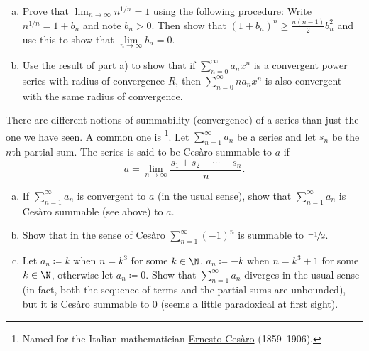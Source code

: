 \begin{samepage}
\begin{exercise}
\leavevmode
\begin{enumerate}[a)]
\item
Prove that $\lim_{n\to\infty} n^{1/n} = 1$ using the following procedure:  Write $n^{1/n} = 1+b_n$ and
note $b_n > 0$.  Then show that ${(1+b_n)}^n \geq 
\frac{n(n-1)}{2}b_n^2$ and use this to show that $\lim\limits_{n\to\infty} b_n = 0$.
\item
Use the result of part a) to show that
if $\sum_{n=0}^\infty a_n x^n$ is a convergent power series with radius of convergence $R$,
then $\sum_{n=0}^\infty n a_n x^n$ is also convergent with the same radius of convergence.
\end{enumerate}
\end{exercise}
\end{samepage}

\begin{exnote}
There are different notions of summability (convergence)
of a series
than just the one we have seen.
A common one is \emph{}%
\footnote{Named for the Italian mathematician
\href{https://en.wikipedia.org/wiki/Ernesto_Ces\%C3\%A0ro}{Ernesto Ces\`aro}
(1859--1906).}.  Let $\sum_{n=1}^\infty a_n$ be a series
and let $s_n$ be the $n$th partial sum.  The series is said to
be Ces\`aro summable to $a$ if
\begin{equation*}
a = \lim_{n\to \infty} \frac{s_1 + s_2 + \cdots + s_n}{n} .
\end{equation*}
\end{exnote}

\begin{exercise}[Challenging]
\pagebreak[2]
\leavevmode
\begin{enumerate}[a)]
\item
If $\sum_{n=1}^\infty a_n$ is convergent to $a$ (in the usual sense), show that
$\sum_{n=1}^\infty a_n$ is Ces\`aro summable (see above) to $a$.
\item
Show that in the sense of Ces\`aro $\sum_{n=1}^\infty {(-1)}^n$ is summable to
$\nicefrac{-1}{2}$.
\item
Let $a_n \coloneqq k$ when $n = k^3$ for some $k \in \N$,
$a_n \coloneqq -k$ when $n = k^3+1$ for some $k \in \N$,
otherwise
let $a_n \coloneqq 0$.  Show that $\sum_{n=1}^\infty a_n$ diverges in the usual sense
(in fact, both the sequence of terms and the partial sums are unbounded), but it is
Ces\`aro summable to 0 (seems a little paradoxical at first sight).
\end{enumerate}
\end{exercise}

